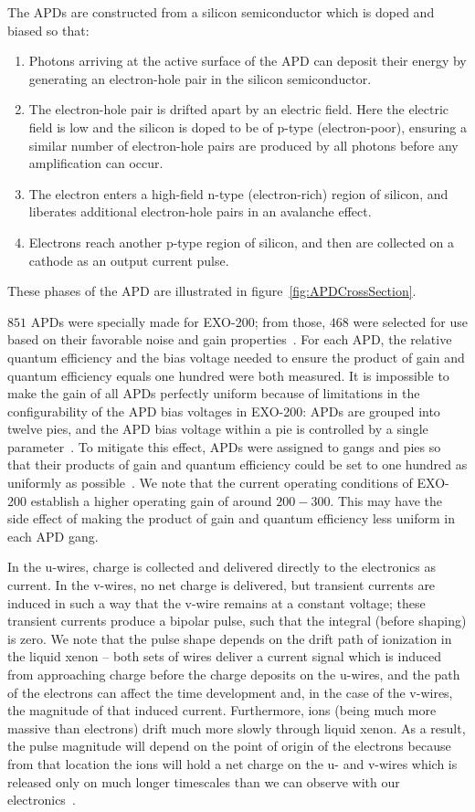The APDs are constructed from a silicon semiconductor which is doped and biased so that:~\cite{Moszynski2002504}
\begin{enumerate}
\item Photons arriving at the active surface of the APD can deposit their energy by generating an electron-hole pair in the silicon semiconductor.
\item The electron-hole pair is drifted apart by an electric field.  Here the electric field is low and the silicon is doped to be of p-type (electron-poor), ensuring a similar number of electron-hole pairs are produced by all photons before any amplification can occur.
\item The electron enters a high-field n-type (electron-rich) region of silicon, and liberates additional electron-hole pairs in an avalanche effect.
\item Electrons reach another p-type region of silicon, and then are collected on a cathode as an output current pulse.
\end{enumerate}
These phases of the APD are illustrated in figure~\ref{fig:APDCrossSection}.

$851$ APDs were specially made for EXO-200; from those, $468$ were selected for use based on their favorable noise and gain properties~\cite{EXOLAAPD}.  For each APD, the relative quantum efficiency and the bias voltage needed to ensure the product of gain and quantum efficiency equals one hundred were both measured.  It is impossible to make the gain of all APDs perfectly uniform because of limitations in the configurability of the APD bias voltages in EXO-200: APDs are grouped into twelve pies, and the APD bias voltage within a pie is controlled by a single parameter~\cite{detectorPartI}.  To mitigate this effect, APDs were assigned to gangs and pies so that their products of gain and quantum efficiency could be set to one hundred as uniformly as possible~\cite{APDMeasurementAndGanging}.  We note that the current operating conditions of EXO-200 establish a higher operating gain of around $200-300$. This may have the side effect of making the product of gain and quantum efficiency less uniform in each APD gang.

In the u-wires, charge is collected and delivered directly to the electronics as current.  In the v-wires, no net charge is delivered, but transient currents are induced in such a way that the v-wire remains at a constant voltage; these transient currents produce a bipolar pulse, such that the integral (before shaping) is zero.  We note that the pulse shape depends on the drift path of ionization in the liquid xenon -- both sets of wires deliver a current signal which is induced from approaching charge before the charge deposits on the u-wires, and the path of the electrons can affect the time development and, in the case of the v-wires, the magnitude of that induced current.  Furthermore, ions (being much more massive than electrons) drift much more slowly through liquid xenon.  As a result, the pulse magnitude will depend on the point of origin of the electrons because from that location the ions will hold a net charge on the u- and v-wires which is released only on much longer timescales than we can observe with our electronics~\cite{EnergyDocumentRun2a,MCDocumentRun2a}.

